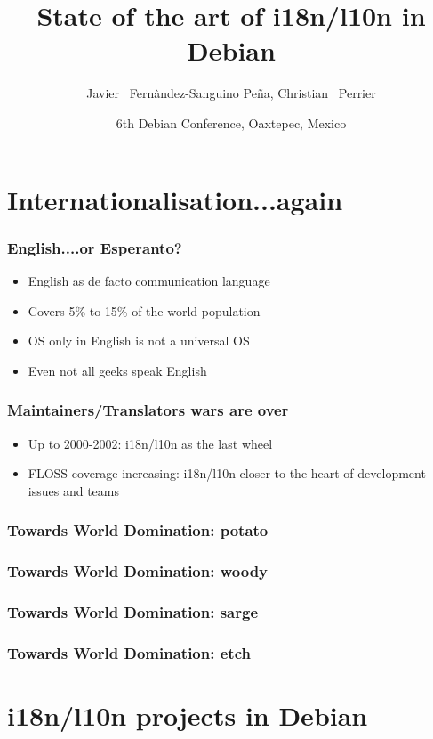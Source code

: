 \documentclass{beamer}
\title[State of the art of i18n/l10n in Debian] 
{State of the art of i18n/l10n in Debian}
\author[jfs, bubulle] 
{Javier ~Fernàndez-Sanguino Peña, Christian ~Perrier}
\date[Debconf 6] 
{6th Debian Conference, Oaxtepec, Mexico}
\begin{document}
\frame{\titlepage}


\section{Internationalisation...again}


\begin{frame}
  \frametitle{English....or Esperanto?}
	\begin{itemize}
	\item
		English as de facto communication language
	\item
		Covers 5\% to 15\% of the world population
	\item
		OS only in English is not a universal OS
	\item
		Even not all geeks speak English
	\end{itemize}
\end{frame}

\begin{frame}
  \frametitle{Maintainers/Translators wars are over}
	\begin{itemize}
	\item
		Up to 2000-2002: i18n/l10n as the last wheel
	\item
		FLOSS coverage increasing: i18n/l10n closer to the heart of development issues and teams
	\end{itemize}
\end{frame}

\begin{frame}
  \frametitle{Towards World Domination: potato}
\end{frame}

\begin{frame}
  \frametitle{Towards World Domination: woody}
\end{frame}

\begin{frame}
  \frametitle{Towards World Domination: sarge}
\end{frame}

\begin{frame}
  \frametitle{Towards World Domination: etch}
\end{frame}

\section{i18n/l10n projects in Debian}
\end{document}
